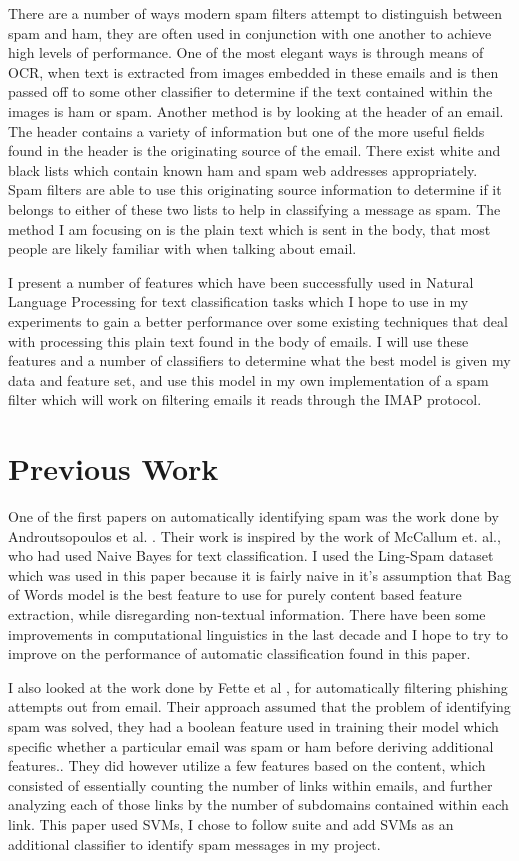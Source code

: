 \documentclass[12pt]{amsart}
\begin{document}
There are a number of ways modern spam filters attempt to distinguish between spam and ham, they are often used in conjunction with one another to achieve high levels of performance.  One of the most elegant ways is through means of OCR, when text is extracted from images embedded in these emails and is then passed off to some other classifier to determine if the text contained within the images is ham or spam.  Another method is by looking at the header of an email.  The header contains a variety of information but one of the more useful fields found in the header is the originating source of the email.  There exist white and black lists which contain known ham and spam web addresses appropriately.  Spam filters are able to use this originating source information to determine if it belongs to either of these two lists to help in classifying a message as spam.  The method I am focusing on is the plain text which is sent in the body, that most people are likely familiar with when talking about email.

I present a number of features which have been successfully used in Natural Language Processing for text classification tasks which I hope to use in my experiments to gain a better performance over some existing techniques that deal with processing this plain text found in the body of emails.  I will use these features and a number of classifiers to determine what the best model is given my data and feature set, and use this model in my own implementation of a spam filter which will work on filtering emails it reads through the IMAP protocol.

\section{Previous Work}

	One of the first papers on automatically identifying spam was the work done by Androutsopoulos et al. \cite{bayesianfiltering}.  Their work is inspired by the work of McCallum et. al.\cite{naivebayes}, who had used Naive Bayes for text classification.  I used the Ling-Spam dataset which was used in this paper because it is fairly naive in it's assumption that Bag of Words model is the best feature to use for purely content based feature extraction, while disregarding non-textual information.  There have been some improvements in computational linguistics in the last decade and I hope to try to improve on the performance of automatic classification found in this paper.
	
	I also looked at the work done by Fette et al \cite{phishing}, for automatically filtering phishing attempts out from email.  Their approach assumed that the problem of identifying spam was solved, they had a boolean feature used in training their model which specific whether a particular email was spam or ham before deriving additional features..  They did however utilize a few features based on the content, which consisted of essentially counting the number of links within emails, and further analyzing each of those links by the number of subdomains contained within each link.  This paper used SVMs, I chose to follow suite and add SVMs as an additional classifier to identify spam messages in my project.
\end{document}
